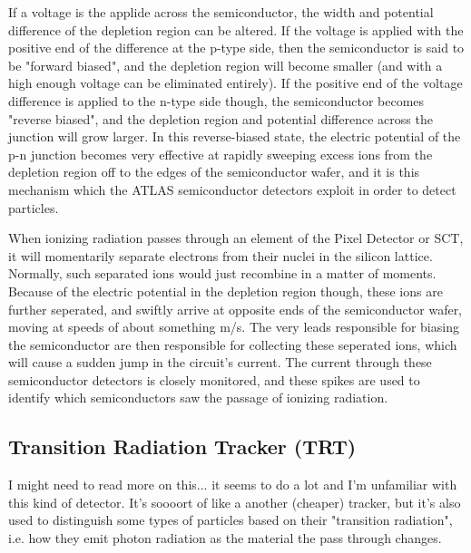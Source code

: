        If a voltage is the applide across the semiconductor, the width and potential difference of the depletion region can be altered.
        If the voltage is applied with the positive end of the difference at the p-type side, then the semiconductor is said to be "forward biased", and the depletion region will become smaller (and with a high enough voltage can be eliminated entirely). \cite{wiley_radiation_detection}
        If the positive end of the voltage difference is applied to the n-type side though, the semiconductor becomes "reverse biased", and the depletion region and potential difference across the junction will grow larger.
        In this reverse-biased state, the electric potential of the p-n junction becomes very effective at rapidly sweeping excess ions from the depletion region off to the edges of the semiconductor wafer, and it is this mechanism which the ATLAS semiconductor detectors exploit in order to detect particles.

        When ionizing radiation passes through an element of the Pixel Detector or SCT, it will momentarily separate electrons from their nuclei in the silicon lattice.
        Normally, such separated ions would just recombine in a matter of moments.
        Because of the electric potential in the depletion region though, these ions are further seperated, and swiftly arrive at opposite ends of the semiconductor wafer, moving at speeds of about something m/s.%
        The very leads responsible for biasing the semiconductor are then responsible for collecting these seperated ions, which will cause a sudden jump in the circuit's current.
        The current through these semiconductor detectors is closely monitored, and these spikes are used to identify which semiconductors saw the passage of ionizing radiation.




    \subsection{Transition Radiation Tracker (TRT)} %
        I might need to read more on this... it seems to do a lot and I'm unfamiliar with this kind of detector.
        It's soooort of like a another (cheaper) tracker,
        but it's also used to distinguish some types of particles based on their "transition radiation",
        i.e. how they emit photon radiation as the material the pass through changes.



